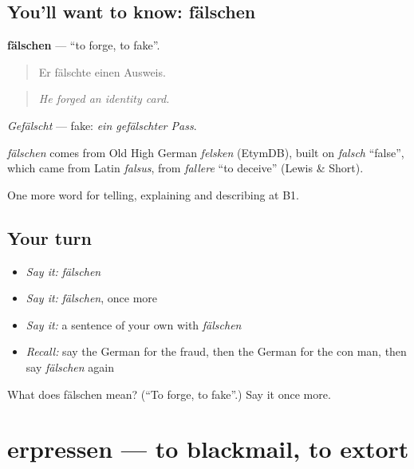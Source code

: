 \subsection*{You'll want to know: fälschen}
\textbf{fälschen} — \textquotedblleft{}to forge, to fake\textquotedblright{}.

\begin{quote}
Er fälschte einen Ausweis.
\end{quote}

\begin{quote}
\emph{He forged an identity card.}
\end{quote}

\emph{Gefälscht} — fake: \emph{ein gefälschter Pass}.

\begin{cousinweb}
\emph{fälschen} comes from Old High German \emph{felsken} (EtymDB), built on \emph{falsch} \textquotedblleft{}false\textquotedblright{}, which came from Latin \emph{falsus}, from \emph{fallere} \textquotedblleft{}to deceive\textquotedblright{} (Lewis \& Short).
\end{cousinweb}

\begin{grammarlens}[title={What you've built}]
One more word for telling, explaining and describing at B1.
\end{grammarlens}

\subsection*{Your turn}
\begin{itemize}
\raggedright
  \item \emph{Say it:} \emph{fälschen}
  \item \emph{Say it:} \emph{fälschen}, once more
  \item \emph{Say it:} a sentence of your own with \emph{fälschen}
  \item \emph{Recall:} say the German for the fraud, then the German for the con man, then say \emph{fälschen} again
\end{itemize}

\begin{tcolorbox}[breakable,colback=teal!4,colframe=teal!35!black,title={Before you move on}]
What does fälschen mean? (\textquotedblleft{}To forge, to fake\textquotedblright{}.) Say it once more.
\end{tcolorbox}
\section[erpressen]{erpressen — to blackmail, to extort}

